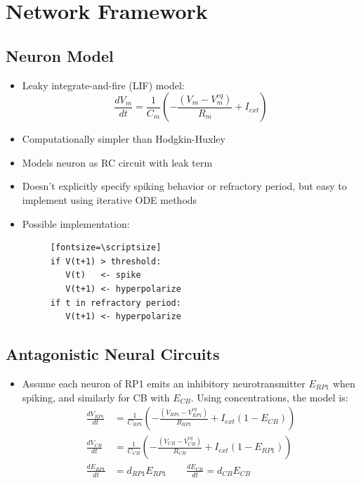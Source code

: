 \documentclass{article}
\begin{document}
\section{Network Framework}

\subsection{Neuron Model}
\begin{itemize}
\item Leaky integrate-and-fire (LIF) model:
\begin{equation*}
\frac{dV_{m}}{dt}=\frac{1}{C_{m}}\left(-\frac{(V_{m}-V_{m}^{eq})}{R_{m}}+I_{ext}\right)
\end{equation*}
\item Computationally simpler than Hodgkin-Huxley
\item Models neuron as RC circuit with leak term
\item Doesn't explicitly specify spiking behavior or refractory period, but easy to implement using iterative ODE methods
\item Possible implementation:
\begin{figure}
\begin{verbatim}[fontsize=\scriptsize]
if V(t+1) > threshold:
   V(t)   <- spike
   V(t+1) <- hyperpolarize
if t in refractory period:
   V(t+1) <- hyperpolarize
\end{verbatim}
\end{figure}
\end{itemize}


\subsection{Antagonistic Neural Circuits}
\begin{itemize}
\item Assume each neuron of RP1 emits an inhibitory neurotransmitter $E_{RP1}$ when spiking, and similarly for CB with $E_{CB}$. Using concentrations, the model is:
\begin{align*}
\frac{dV_{RP1}}{dt}&=\frac{1}{C_{RP1}}\left(-\frac{(V_{RP1}-V_{RP1}^{eq})}{R_{RP1}}+I_{ext}\left(1-E_{CB}\right)\right)\\
\frac{dV_{CB}}{dt}&=\frac{1}{C_{CB}}\left(-\frac{(V_{CB}-V_{CB}^{eq})}{R_{CB}}+I_{ext}\left(1-E_{RP1}\right)\right)\\
\frac{dE_{RP1}}{dt}&=d_{RP1}E_{RP1}\hspace{2em}\frac{dE_{CB}}{dt}=d_{CB}E_{CB}
\end{align*}
\end{itemize}
\end{document}
